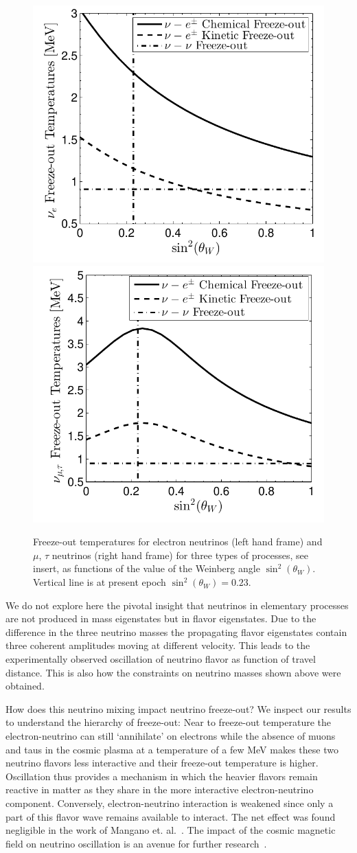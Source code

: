 \begin{figure}
\centerline{\includegraphics[width=0.49\linewidth]{plots/nu_e_freezeout.pdf}
\includegraphics[width=0.49\linewidth]{plots/nu_mu_freezeout.pdf}}
\caption{Freeze-out temperatures for electron neutrinos (left hand frame) and $\mu$, $\tau$ neutrinos (right hand frame) for three types of processes, see insert, as functions of the value of the Weinberg angle $\sin^2(\theta_W)$. Vertical line is at present epoch $\sin^2(\theta_W)=0.23$. }
\label{fig:freeze-outT_B}
 \end{figure}

We do not explore here the pivotal insight that neutrinos in elementary processes are not produced in mass eigenstates but in flavor eigenstates. Due to the difference in the three neutrino masses the propagating flavor eigenstates contain three coherent amplitudes moving at different velocity. This leads to the experimentally observed oscillation of neutrino flavor as function of travel distance. This is also how the constraints on neutrino masses shown above were obtained.

How does this neutrino mixing impact neutrino freeze-out? We inspect our results to understand the hierarchy of freeze-out: Near to freeze-out temperature the electron-neutrino can still `annihilate' on electrons while the absence of muons and taus in the cosmic plasma at a temperature of a few MeV makes these two neutrino flavors less interactive and their freeze-out temperature is higher. Oscillation thus provides a mechanism in which the heavier flavors remain reactive in matter as they share in the more interactive electron-neutrino component. Conversely, electron-neutrino interaction is weakened since only a part of this flavor wave remains available to interact. The net effect was found negligible in the work of Mangano et. al.~\cite{Mangano:2005cc}. The impact of the cosmic magnetic field on neutrino oscillation is an avenue for further research~\cite{Rafelski:2023zgp}.

